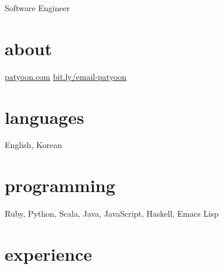 \documentclass[]{patyoon-cv}
\begin{document}
{Software Engineer}

\begin{aside}
\section{about}
\href{https://patyoon.com}{patyoon.com}
\href{https://bit.ly/email-patyoon}{bit.ly/email-patyoon}
\section{languages}
English, Korean
\section{programming}
Ruby,
Python,
Scala,
Java,
JavaScript,
Haskell,
Emacs Lisp
\end{aside}

\section{experience}
\end{document}

